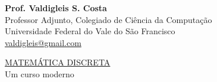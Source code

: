 \begingroup
  \thispagestyle{empty}
  \vspace*{1.0cm}
  \begin{flushleft}
    {\Large \textbf{Prof. Valdigleis S. Costa}}\\
    Professor Adjunto, Colegiado de Ciência da Computação\\
    Universidade Federal do Vale do São Francisco\\
    \url{valdigleis@gmail.com}
  \end{flushleft}
  \begin{flushleft}
    {\LARGE\underline{MATEMÁTICA DISCRETA}}\\
    {\large Um curso moderno}
  \end{flushleft}
\endgroup
